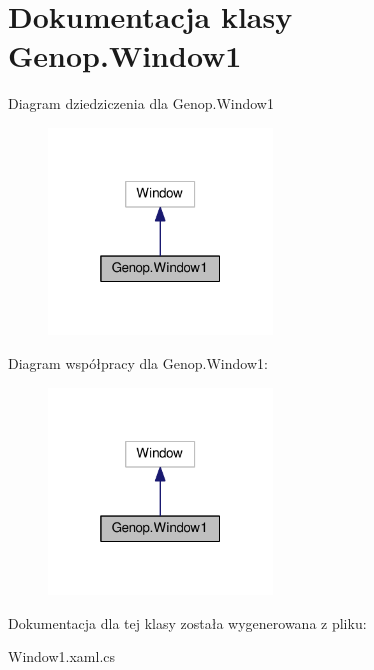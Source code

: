 \hypertarget{classGenop_1_1Window1}{}\section{Dokumentacja klasy Genop.\+Window1}
\label{classGenop_1_1Window1}


Diagram dziedziczenia dla Genop.\+Window1
\nopagebreak
\begin{figure}[H]
\begin{center}
\leavevmode
\includegraphics[width=169pt]{dc/de5/classGenop_1_1Window1__inherit__graph}
\end{center}
\end{figure}


Diagram współpracy dla Genop.\+Window1\+:
\nopagebreak
\begin{figure}[H]
\begin{center}
\leavevmode
\includegraphics[width=169pt]{d7/d3b/classGenop_1_1Window1__coll__graph}
\end{center}
\end{figure}


Dokumentacja dla tej klasy została wygenerowana z pliku\+:\begin{DoxyCompactItemize}
\item 
Window1.\+xaml.\+cs\end{DoxyCompactItemize}
